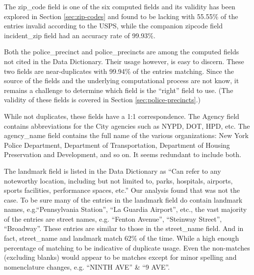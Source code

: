 \documentclass[12pt, titlepage]{article}
\begin{document}
 \label{sec:zipcodes}
 The zip\_code field is one of the six computed fields and its validity 
 has been explored in Section \ref{sec:zip-codes} and found to be 
 lacking with 55.55\% of the entries invalid according to the 
 USPS, while the companion zipcode field incident\_zip field had 
 an accuracy rate of 99.93\%. 


 \label{sec:police} 
Both the police\_precinct and police\_precincts are among the computed 
fields not cited in the Data Dictionary. Their usage however, is easy to 
discern. These two fields are near-duplicates with 99.94\% of the entries 
matching. Since the source of the fields and the underlying computational 
process are not know, it remains a challenge to determine which 
field is the ``right'' field to use. (The validity of these fields is 
covered in Section \ref{sec:police-precincts}.)


 \label{sec:agencyname}
 While not duplicates, these fields have a 1:1 correspondence.  The Agency 
 field contains abbreviations for the City agencies such as NYPD, DOT, 
 HPD, etc. The agency\_name field contains the full name of 
 the various organizations: New York Police Department, Department 
 of Transportation, Department of Housing Preservation and 
 Development, and so on. It seems redundant to include both.


\label{sec:landmark}
The landmark field is listed in the Data Dictionary as ``Can refer to 
any noteworthy location, including but not limited to, parks, 
hospitals, airports, sports facilities, performance spaces, etc.'' Our analysis
found that was not the case. To be sure many of the entries in 
the landmark field do contain landmark names, e.g.``Pennsylvania 
Station'', ``La Guardia Airport'', etc., the vast majority 
of the entries are street names, e.g. ``Fenton Avenue'', ``Steinway 
Street'', ``Broadway''. These entries are similar to those in the 
street\_name field. And in fact, street\_name and landmark 
match 62\% of the time. While a high enough percentage of matching 
to be indicative of duplicate usage. Even the non-matches 
(excluding blanks) would appear to be matches except for minor 
spelling and nomenclature changes, e.g. ``NINTH AVE'' \& ``9 AVE''.
\end{document}
